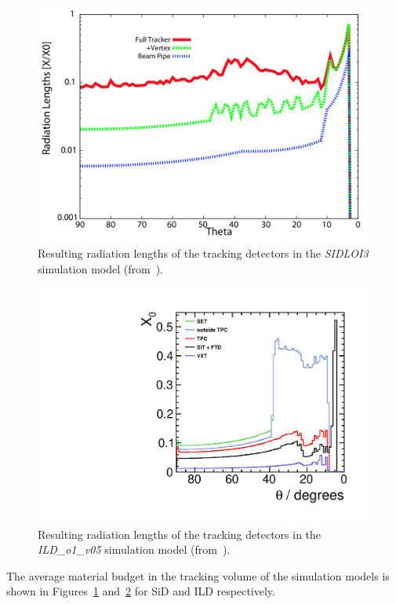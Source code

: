 \begin{figure}
\begin{center}
\includegraphics[width=0.80\hsize]{chapters/figures/SiD_material_budget_tracker.png}
\end{center}
\caption{Resulting radiation lengths of the tracking detectors in the \emph{SIDLOI3} simulation model (from~\cite{Behnke:2013lya}).}
\label{fig:sid_mat_budget}
\end{figure}
\begin{figure}
\begin{center}
\includegraphics[width=0.80\hsize]{chapters/figures/ILD_material_budget_tracker.pdf}
\end{center}
\caption{Resulting radiation lengths of the tracking detectors in the \emph{ILD\_o1\_v05} simulation model (from~\cite{Behnke:2013lya}).}
\label{fig:ILD_mat_budget}
\end{figure}
The average material budget in the tracking volume of the simulation models is shown in Figures~\ref{fig:sid_mat_budget}
and~\ref{fig:ILD_mat_budget} for SiD and ILD respectively.

